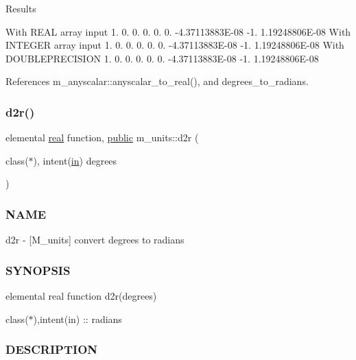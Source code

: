 Results

With R\+E\+AL array input 1. 0. 0. 0. 0. 0. -\/4.\+37113883E-\/08 -\/1. 1.\+19248806E-\/08 With I\+N\+T\+E\+G\+ER array input 1. 0. 0. 0. 0. 0. -\/4.\+37113883E-\/08 -\/1. 1.\+19248806E-\/08 With D\+O\+U\+B\+L\+E\+P\+R\+E\+C\+I\+S\+I\+ON 1. 0. 0. 0. 0. 0. -\/4.\+37113883E-\/08 -\/1. 1.\+19248806E-\/08 

References m\+\_\+anyscalar\+::anyscalar\+\_\+to\+\_\+real(), and degrees\+\_\+to\+\_\+radians.

\mbox{\label{namespacem__units_a51fd676dee35aafbbd777cb88c347e23}} 
\subsubsection{\texorpdfstring{d2r()}{d2r()}}
{\footnotesize\ttfamily elemental \hyperlink{read__watch_83_8txt_abdb62bde002f38ef75f810d3a905a823}{real} function, \hyperlink{M__stopwatch_83_8txt_a2f74811300c361e53b430611a7d1769f}{public} m\+\_\+units\+::d2r (\begin{DoxyParamCaption}\item[{class($\ast$), intent(\hyperlink{M__journal_83_8txt_afce72651d1eed785a2132bee863b2f38}{in})}]{degrees }\end{DoxyParamCaption})}



\subsubsection*{N\+A\+ME}

d2r -\/ \mbox{[}M\+\_\+units\mbox{]} convert degrees to radians \subsubsection*{S\+Y\+N\+O\+P\+S\+IS}

elemental real function d2r(degrees)

class($\ast$),intent(in) \+:\+: radians \subsubsection*{D\+E\+S\+C\+R\+I\+P\+T\+I\+ON}

